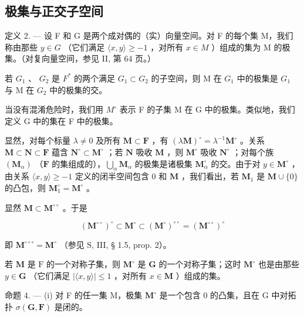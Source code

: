 \subsection{极集与正交子空间}

定义 2. --- 设 F 和 G 是两个成对偶的（实）向量空间。对 F 的每个集 M，我们称由那些 \(y \in G\) （它们满足 \(\langle x, y \rangle \geqslant -1\) ，对所有 \(x \in M\) ）组成的集为 M 的极集。（对复向量空间，参见 II, 第 64 页。）

若 \(G_{1}\) 、 \(G_{2}\) 是 \(F^{*}\) 的两个满足 \(G_{1} \subset G_{2}\) 的子空间，则 M 在 \(G_{1}\) 中的极集是 \(G_{1}\) 与 M 在 \(G_{2}\) 中的极集的交。

当没有混淆危险时，我们用 \(M^{\circ}\) 表示 F 的子集 M 在 G 中的极集。类似地，我们定义 G 中的集在 F 中的极集。

显然，对每个标量 \(\lambda \neq 0\) 及所有 \(\mathbf{M} \subset \mathbf{F}\) ，有 \((\lambda \mathbf{M})^{\circ} = \lambda^{-1} \mathbf{M}^{\circ}\) 。关系 \(\mathbf{M} \subset \mathbf{N} \subset \mathbf{F}\) 蕴含 \(\mathbf{N}^{\circ} \subset \mathbf{M}^{\circ}\) ；若 \(\mathbf{N}\) 吸收 \(\mathbf{M}\) ，则 \(\mathbf{M}^{\circ}\) 吸收 \(\mathbf{N}^{\circ}\) ；对每个族 \((\mathbf{M}_{\alpha})\) （\(\mathbf{F}\) 的集组成的），\(\bigcup_{\alpha} \mathbf{M}_{\alpha}\) 的极集是诸极集 \(\mathbf{M}_{\alpha}^{\circ}\) 的交。由于对 \(y \in \mathbf{M}^{\circ}\) ，由关系 \(\langle x, y \rangle \geqslant -1\) 定义的闭半空间包含 0 和 \(\mathbf{M}\) ，我们看出，若 \(\mathbf{M}_{1}\) 是 \(\mathbf{M} \cup \{0\}\) 的凸包，则 \(\mathbf{M}_{1}^{\circ} = \mathbf{M}^{\circ}\) 。

显然 \(\mathbf{M} \subset \mathbf{M}^{\circ \circ}\) 。于是

\[
(\mathbf {M} ^ {\circ \circ}) ^ {\circ} \subset \mathbf {M} ^ {\circ} \subset (\mathbf {M} ^ {\circ}) ^ {\circ \circ} = (\mathbf {M} ^ {\circ \circ}) ^ {\circ}
\]

即 \(\mathbf{M}^{\circ \circ \circ} = \mathbf{M}^{\circ}\) （参见 S, III, § 1.5, prop. 2）。

若 \(\mathbf{M}\) 是 \(\mathrm{F}\) 的一个对称子集，则 \(\mathbf{M}^{\circ}\) 是 \(\mathbf{G}\) 的一个对称子集；这时 \(\mathbf{M}^{\circ}\) 也是由那些 \(y \in \mathbf{G}\) （它们满足 \(|\langle x, y \rangle| \leqslant 1\) ，对所有 \(x \in \mathbf{M}\) ）组成的集。

命题 4. --- (i) 对 F 的任一集 M，极集 \(\mathbf{M}^{\circ}\) 是一个包含 0 的凸集，且在 G 中对拓扑 \(\sigma(\mathbf{G},\mathbf{F})\) 是闭的。

